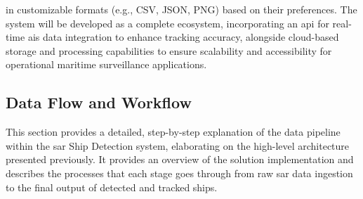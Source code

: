 \documentclass{article}
\begin{document}
in customizable formats (e.g., CSV, JSON, PNG) based on their preferences. The system will be
developed as a complete ecosystem, incorporating an \acrshort{api} for real-time \acrshort{ais} data integration to
enhance tracking accuracy, alongside cloud-based storage and processing capabilities to
ensure scalability and accessibility for operational maritime surveillance applications. \subsection{Data Flow and Workflow}
This section provides a detailed, step-by-step explanation of the data pipeline within the \acrshort{sar} Ship Detection system, elaborating on the high-level architecture presented previously. It provides an overview of the solution implementation and describes the processes that each stage goes through from raw \acrshort{sar} data ingestion to the final output of detected and tracked ships.\\
\end{document}
